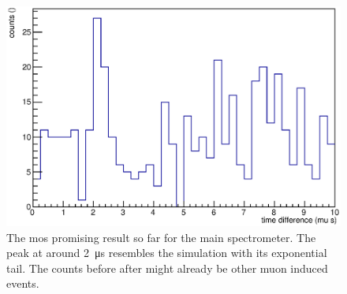     \begin{figure}
	\centerline{\includegraphics[width = 1.\textwidth]{graphics/analysis/mainSpec/allInOne/1052_1055.eps}}
	\caption[Main Spectrometer Peak?]{The mos promising result so far for the main spectrometer. The peak at around \SI{2}{\micro\second} resembles the simulation with its exponential tail. The counts before after might already be other muon induced events.}
  	\label{fig:mainSpecProminentPeak}
  \end{figure}



  
  
